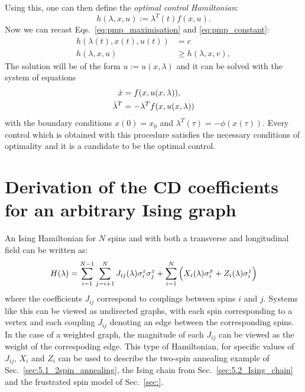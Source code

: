 Using this, one can then define the \emph{optimal control Hamiltonian}:
\begin{equation}
    h(\lambda, x, u) := \lambda^T(t) f(x, u).
\end{equation}
Now we can recast Eqs.~\eqref{eq:pmp_maximisation} and \eqref{eq:pmp_constant}:
\begin{equation}
    \begin{aligned}
        h(\lambda(t), x(t), u(t)) &= c \\
        h(\lambda, x, u) &\geq h(\lambda, x, v),
    \end{aligned}
\end{equation}
The solution will be of the form $u := u(x, \lambda)$ and it can be solved with the system of equations
\begin{equation}
    \begin{aligned}
        \dot{x} &= f(x, u(x, \lambda)), \\
        \dot{\lambda}^T &= -\lambda^T f(x, u(x, \lambda))
    \end{aligned}
\end{equation}
with the boundary conditions $x(0) = x_0$ and $\lambda^T(\tau) = -\phi(x(\tau))$. Every control which is obtained with this procedure satisfies the necessary conditions of optimality and it is a candidate to be the optimal control.

\chapter{Derivation of the CD coefficients for an arbitrary Ising graph}\label{app:arbitrary_ising_derivation}

An Ising Hamiltonian for $N$ spins and with both a transverse and longitudinal field can be written as:
\begin{equation}\label{eq:ising_hamiltonian}
    H(\lambda) = \sum_{i = 1}^{N-1}\sum_{j = i+1}^{N} J_{ij}(\lambda) \sigma^z_i \sigma^z_j + \sum_{i = 1}^{N} \Big( X_i(\lambda) \sigma^x_i + Z_i(\lambda) \sigma^z_i \Big)
\end{equation}
where the coefficients $J_{ij}$ correspond to couplings between spins $i$ and $j$. Systems like this can be viewed as undirected graphs, with each spin corresponding to a vertex and each coupling $J_{ij}$ denoting an edge between the corresponding spins. In the case of a weighted graph, the magnitude of each $J_{ij}$ can be viewed as the weight of the correspoding edge. This type of Hamiltonian, for specific values of $J_{ij}$, $X_i$ and $Z_i$ can be used to describe the two-spin annealing example of Sec.~\ref{sec:5.1_2spin_annealing}, the Ising chain from Sec.~\ref{sec:5.2_Ising_chain} and the frustrated spin model of Sec.~\ref{sec:}. 

